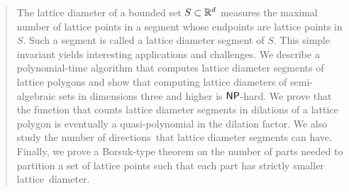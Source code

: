 \begin{abstract}
    \noindent The lattice diameter of a bounded set $S \subset \R^d$ measures the maximal number of lattice points in a segment whose endpoints are lattice points in $S$. Such a segment is called a lattice diameter segment of $S$. This simple invariant yields interesting applications and challenges. We describe a polynomial-time algorithm that computes lattice diameter segments of lattice polygons and show that computing lattice diameters of semi-algebraic sets in dimensions three and higher is $\NP$-hard.
    We prove that the function that counts lattice diameter segments in dilations of a lattice polygon is eventually a quasi-polynomial in the dilation factor.
    We also study the number of \mbox{directions that} lattice diameter segments can have. Finally, we prove a Borsuk-type theorem on the number of parts needed to partition a set of lattice points such that each part has strictly smaller \mbox{lattice diameter}.
\end{abstract}
